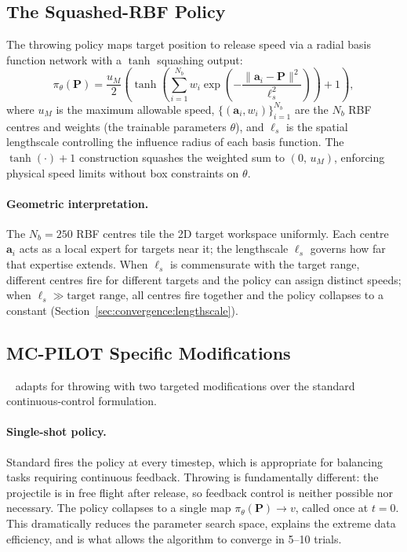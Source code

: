 \subsection{The Squashed-RBF Policy}
\label{sec:background:policy}

The throwing policy maps target position to release speed via a radial basis function
network with a $\tanh$ squashing output:
\begin{equation}
  \pi_\theta(\mathbf{P}) = \frac{u_M}{2}\!\left(
    \tanh\!\left(
      \sum_{i=1}^{N_b} w_i \exp\!\left(
        -\frac{\|\mathbf{a}_i - \mathbf{P}\|^2}{\ell_s^2}
      \right)
    \right) + 1
  \right),
  \label{eq:policy}
\end{equation}
where $u_M$ is the maximum allowable speed, $\{(\mathbf{a}_i, w_i)\}_{i=1}^{N_b}$ are
the $N_b$ RBF centres and weights (the trainable parameters $\theta$), and $\ell_s$ is
the spatial lengthscale controlling the influence radius of each basis function.
The $\tanh(\cdot) + 1$ construction squashes the weighted sum to $(0,\, u_M)$, enforcing
physical speed limits without box constraints on $\theta$.

\paragraph{Geometric interpretation.}
The $N_b = 250$ RBF centres tile the 2D target workspace uniformly.
Each centre $\mathbf{a}_i$ acts as a local expert for targets near it; the lengthscale
$\ell_s$ governs how far that expertise extends.
When $\ell_s$ is commensurate with the target range, different centres fire for
different targets and the policy can assign distinct speeds; when $\ell_s \gg
\text{target range}$, all centres fire together and the policy collapses to a constant
(Section~\ref{sec:convergence:lengthscale}).

\subsection{MC-PILOT Specific Modifications}
\label{sec:background:mcpilot}

\mcpilot{}~\cite{turcato2025mcpilot} adapts \mcpilco{} for throwing with two targeted
modifications over the standard continuous-control formulation.

\paragraph{Single-shot policy.}
Standard \mcpilco{} fires the policy at every timestep, which is appropriate for
balancing tasks requiring continuous feedback.
Throwing is fundamentally different: the projectile is in free flight after release, so
feedback control is neither possible nor necessary.
The policy collapses to a single map $\pi_\theta(\mathbf{P}) \to v$, called once at
$t{=}0$.
This dramatically reduces the parameter search space, explains the extreme data
efficiency, and is what allows the algorithm to converge in 5--10 trials.

